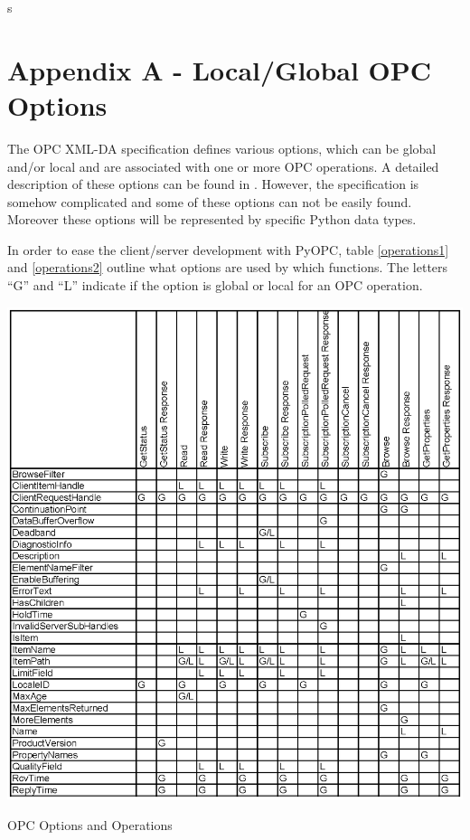 s%


\section {Appendix A - Local/Global OPC Options}
\thispagestyle{plain}

The OPC XML-DA specification defines various options, which can be
global and/or local and are associated with one or more OPC operations.
A detailed description of these options can be found in \cite{OPCXMLDA}.
However, the specification is somehow complicated and some of these
options can not be easily found. Moreover these options will be 
represented by specific Python data types.

In order to ease the client/server development with PyOPC, table
\ref{operations1} and \ref{operations2} outline what options are
used by which functions. The letters ``G'' and ``L'' indicate if the
option is global or local for an OPC operation.

\begin{table}[!ht]
\centering
\includegraphics[scale=0.9]{graphics/operations1.eps}
\caption{OPC Options and Operations}
\label {operations1} 
\end{table}

